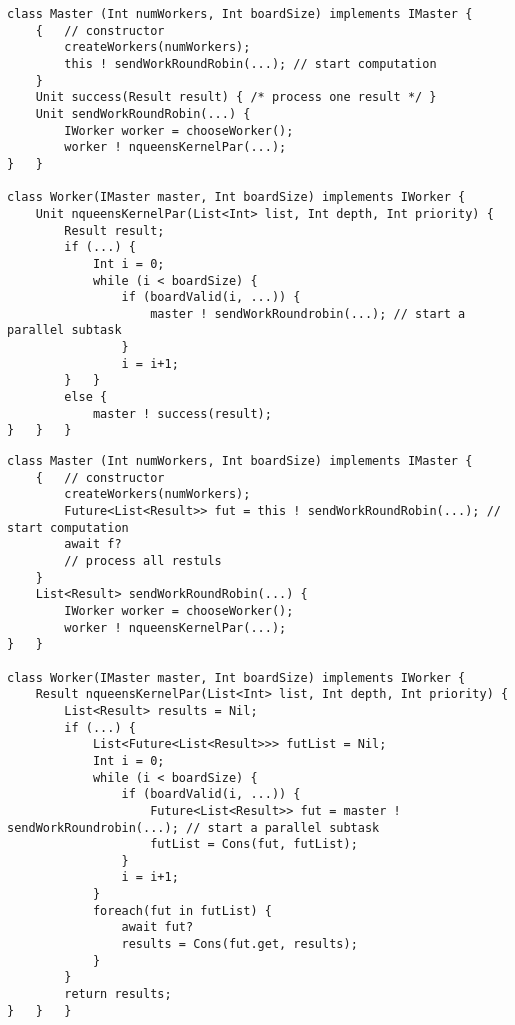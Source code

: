 \begin{lstlisting}[caption=NQueens in ABS , label=absex]
class Master (Int numWorkers, Int boardSize) implements IMaster {
	{   // constructor
		createWorkers(numWorkers);
		this ! sendWorkRoundRobin(...); // start computation
	}
	Unit success(Result result) { /* process one result */ }
	Unit sendWorkRoundRobin(...) {
		IWorker worker = chooseWorker();
		worker ! nqueensKernelPar(...);
}	}

class Worker(IMaster master, Int boardSize) implements IWorker {
	Unit nqueensKernelPar(List<Int> list, Int depth, Int priority) {
		Result result;
		if (...) { 
    		Int i = 0;
			while (i < boardSize) {
				if (boardValid(i, ...)) {
					master ! sendWorkRoundrobin(...); // start a parallel subtask
				}
				i = i+1;
		}	}
		else {
			master ! success(result);
}	}	}
\end{lstlisting}


\begin{lstlisting}[caption=NQueens in ABS , label=absex]
class Master (Int numWorkers, Int boardSize) implements IMaster {
	{   // constructor
		createWorkers(numWorkers);
		Future<List<Result>> fut = this ! sendWorkRoundRobin(...); // start computation
		await f?
		// process all restuls
	}
	List<Result> sendWorkRoundRobin(...) {
		IWorker worker = chooseWorker();
		worker ! nqueensKernelPar(...);
}	}

class Worker(IMaster master, Int boardSize) implements IWorker {
	Result nqueensKernelPar(List<Int> list, Int depth, Int priority) {
		List<Result> results = Nil;
		if (...) { 
			List<Future<List<Result>>> futList = Nil;
    		Int i = 0;
			while (i < boardSize) {
				if (boardValid(i, ...)) {
					Future<List<Result>> fut = master ! sendWorkRoundrobin(...); // start a parallel subtask
					futList = Cons(fut, futList);
				}
				i = i+1;
			}
			foreach(fut in futList) {
				await fut?
				results = Cons(fut.get, results);
			}
		}
		return results;
}	}	}
\end{lstlisting}


